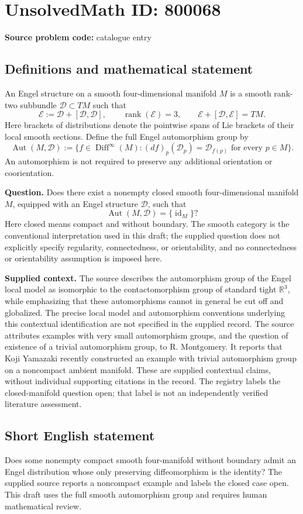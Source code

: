 \documentclass[11pt]{article}
\begin{document}
\section*{UnsolvedMath ID: 800068}
\textbf{Source problem code:} catalogue entry
\subsection{Definitions and mathematical statement}
An Engel structure on a smooth four-dimensional manifold \(M\) is a smooth rank-two subbundle \(\mathcal D\subset TM\) such that
\[
\mathcal E:=\mathcal D+[\mathcal D,\mathcal D],\qquad
\operatorname{rank}(\mathcal E)=3,\qquad
\mathcal E+[\mathcal D,\mathcal E]=TM.
\]
Here brackets of distributions denote the pointwise spans of Lie brackets of their local smooth sections. Define the full Engel automorphism group by
\[
\operatorname{Aut}(M,\mathcal D)
:=\{f\in\operatorname{Diff}^{\infty}(M):
(df)_p(\mathcal D_p)=\mathcal D_{f(p)}\text{ for every }p\in M\}.
\]
An automorphism is not required to preserve any additional orientation or coorientation.

\textbf{Question.} Does there exist a nonempty closed smooth four-dimensional manifold \(M\), equipped with an Engel structure \(\mathcal D\), such that
\[
\operatorname{Aut}(M,\mathcal D)=\{\operatorname{id}_M\}?
\]
Here closed means compact and without boundary. The smooth category is the conventional interpretation used in this draft; the supplied question does not explicitly specify regularity, connectedness, or orientability, and no connectedness or orientability assumption is imposed here.

\textbf{Supplied context.} The source describes the automorphism group of the Engel local model as isomorphic to the contactomorphism group of standard tight \(\mathbb R^3\), while emphasizing that these automorphisms cannot in general be cut off and globalized. The precise local model and automorphism conventions underlying this contextual identification are not specified in the supplied record. The source attributes examples with very small automorphism groups, and the question of existence of a trivial automorphism group, to R. Montgomery. It reports that Koji Yamazaki recently constructed an example with trivial automorphism group on a noncompact ambient manifold. These are supplied contextual claims, without individual supporting citations in the record. The registry labels the closed-manifold question open; that label is not an independently verified literature assessment.
\subsection{Short English statement}
Does some nonempty compact smooth four-manifold without boundary admit an Engel distribution whose only preserving diffeomorphism is the identity? The supplied source reports a noncompact example and labels the closed case open. This draft uses the full smooth automorphism group and requires human mathematical review.
\end{document}
